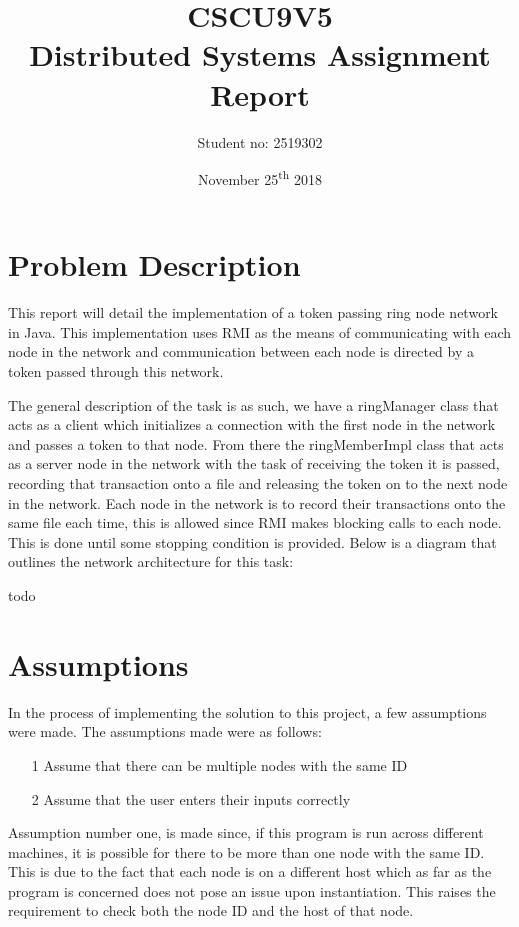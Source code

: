 \documentclass[11pt, a4paper]{article}
\title{\vspace*{\fill}CSCU9V5 \\ Distributed Systems Assignment Report}
\author{Student no: 2519302}
\date{November 25\textsuperscript{th} 2018\vspace*{\fill}}
\begin{document}
\clearpage\maketitle
\thispagestyle{empty}
\newpage
\doublespacing
{}
\tableofcontents
\thispagestyle{empty}
\newpage
\singlespacing

\section{Problem Description}

This report will detail the implementation of a token passing ring node network in Java. This implementation uses RMI as the means of communicating with each node in the network and communication between each node is directed by a token passed through this network. 

The general description of the task is as such, we have a ringManager class that acts as a client which initializes a connection with the first node in the network and passes a token to that node. From there the ringMemberImpl class that acts as a server node in the network with the task of receiving the token it is passed, recording that transaction onto a file and releasing the token on to the next node in the network. Each node in the network is to record their transactions onto the same file each time, this is allowed since RMI makes blocking calls to each node.  This is done until some stopping condition is provided. Below is a diagram that outlines the network architecture for this task:

\begin{center}
todo
\end{center} 

\section{Assumptions}

In the process of implementing the solution to this project, a few assumptions were made. The assumptions made were as follows:

\begin{itemize}
\item[1] Assume that there can be multiple nodes with the same ID
\item[2] Assume that the user enters their inputs correctly
\end{itemize}
Assumption number one, is made since, if this program is run across different machines, it is possible for there to be more than one node with the same ID. This is due to the fact that each node is on a different host which as far as the program is concerned does not pose an issue upon instantiation. This raises the requirement to check both the node ID and the host of that node.
\end{document}
